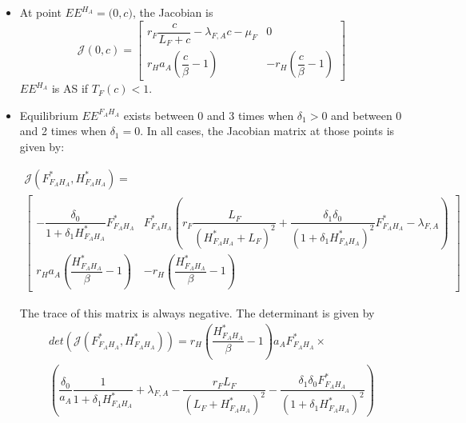 \documentclass{article}
\newcommand{\lfa}{\lambda_{F, A}}
\begin{document}
\begin{itemize}
\item At point $EE^{H_A} = \Big(0,c \Big)$, the Jacobian is
\begin{equation}
\mathcal{J}(0,c) = \begin{bmatrix}
r_F \dfrac{c}{L_F +c} - \lfa c - \mu_F & 0 \\
r_H a_A (\dfrac{c}{\beta} - 1) & -r_H(\dfrac{c}{\beta} - 1)
\end{bmatrix}
\end{equation}
$EE^{H_A}$ is AS if $T_F(c) < 1$.


\item Equilibrium $EE^{F_AH_A}$ exists between 0 and 3 times when $\delta_1 > 0$ and between 0 and 2 times when $\delta_1=0$. In all cases, the Jacobian matrix at those points is given by:

\begin{multline}
\mathcal{J}(F^*_{F_AH_A}, H^*_{F_AH_A}) = \\ \begin{bmatrix}
- \dfrac{\delta_0}{1 + \delta_1 H^*_{F_AH_A}}F^*_{F_AH_A} & F^*_{F_AH_A} \left(r_F \dfrac{L_F}{(H^*_{F_AH_A} + L_F)^2} + \dfrac{\delta_1 \delta_0}{(1 + \delta_1 H^*_{F_AH_A})^2}F^*_{F_AH_A} - \lfa \right) \\
r_H a_A (\dfrac{H^*_{F_AH_A}}{\beta} - 1) & -r_H(\dfrac{H^*_{F_AH_A}}{\beta} - 1)
\end{bmatrix}
\label{anthropicFH:eqFH:jacobian}
\end{multline}

The trace of this matrix is always negative. The determinant is given by
\begin{multline}
det(\mathcal{J}(F^*_{F_AH_A}, H^*_{F_AH_A})) = r_H \left(\dfrac{H^*_{F_AH_A}}{\beta} - 1 \right) a_A F^*_{F_AH_A} \times \\\left(\dfrac{\delta_0}{a_A} \dfrac{1}{1 + \delta_1 H^*_{F_AH_A}} + \lfa - \dfrac{r_F L_F}{(L_F + H^*_{F_AH_A})^2} - \dfrac{\delta_1 \delta_0F^*_{F_AH_A}}{(1+ \delta_1H^*_{F_AH_A})^2}\right)
\end{multline}


\end{itemize}
\end{document}
